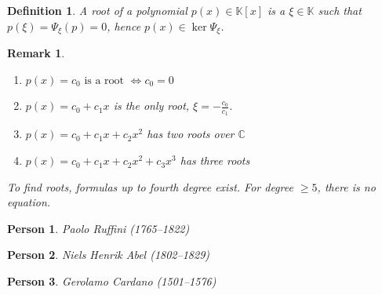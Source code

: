 \documentclass{article}
\newcounter{lecref}[section]
\numberwithin{lecref}{section}
\newtheorem{definition}[lecref]{Definition}
\newtheorem{remark}[lecref]{Remark}
\newtheorem*{person}{Person}
\begin{document}
\begin{definition}
  A \emph{root of a polynomial} $p(x) \in \mathbb K[x]$ is a $\xi \in \mathbb K$ such that $p(\xi) = \Psi_{\xi}(p) = 0$,
  hence $p(x) \in \ker{\Psi_{\xi}}$.
\end{definition}

\begin{remark}
  \begin{enumerate}
    \item $p(x) = c_0 \text{ is a root } \iff c_0 = 0$
    \item $p(x) = c_0 + c_1 x$ is the only root, $\xi = -\frac{c_0}{c_1}$.
    \item $p(x) = c_0 + c_1 x + c_2 x^2$ has two roots over $\mathbb C$
    \item $p(x) = c_0 + c_1 x + c_2 x^2 + c_3 x^3$ has three roots
  \end{enumerate}

  To find roots, formulas up to fourth degree exist.
  For degree $\geq 5$, there is no equation.
\end{remark}

\begin{person}
  Paolo Ruffini (1765--1822)
\end{person}
\begin{person}
  Niels Henrik Abel (1802--1829)
\end{person}
\begin{person}
  Gerolamo Cardano (1501--1576)
\end{person}
\end{document}
